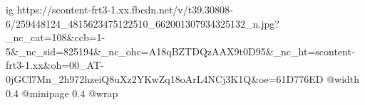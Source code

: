  
 
 
 
 

\ifcmt
  ig https://scontent-frt3-1.xx.fbcdn.net/v/t39.30808-6/259448124_4815623475122510_662001307934325132_n.jpg?_nc_cat=108&ccb=1-5&_nc_sid=825194&_nc_ohc=A18qBZTDQzAAX9t0D95&_nc_ht=scontent-frt3-1.xx&oh=00_AT-0jGCl7Mn_2h972hzeiQ8uXz2YKwZq18oArL4NCj3K1Q&oe=61D776ED
  @width 0.4
  @minipage 0.4
  @wrap \parpic[r]
\fi
